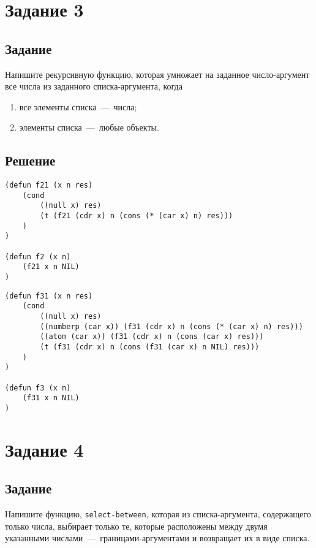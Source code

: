 \section{Задание 3}
\subsection*{Задание}
Напишите рекурсивную функцию, которая умножает на заданное число-аргумент все числа из заданного списка-аргумента, когда

\begin{enumerate}
    \item все элементы списка~---~числа;
    \item элементы списка~---~любые объекты.
\end{enumerate}

\subsection*{Решение}
\begin{code}
\begin{verbatim}
(defun f21 (x n res)
    (cond 
        ((null x) res)
        (t (f21 (cdr x) n (cons (* (car x) n) res)))
    )
)

(defun f2 (x n)
    (f21 x n NIL)
)
\end{verbatim}
\end{code}

\begin{code}
\begin{verbatim}
(defun f31 (x n res)
    (cond 
        ((null x) res)
        ((numberp (car x)) (f31 (cdr x) n (cons (* (car x) n) res)))
        ((atom (car x)) (f31 (cdr x) n (cons (car x) res)))
        (t (f31 (cdr x) n (cons (f31 (car x) n NIL) res)))
    )
)

(defun f3 (x n) 
	(f31 x n NIL)
)
\end{verbatim}
\end{code}


\section{Задание 4}
\subsection*{Задание}
Напишите функцию, \texttt{select-between}, которая из списка-аргумента, содержащего только числа, выбирает только те, которые расположены между двумя указанными числами~---~границами-аргументами и возвращает их в виде списка.

